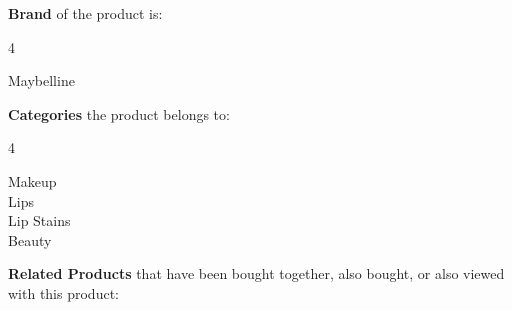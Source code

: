 \noindent \textbf{Brand} of the product is:

\begin{multicols}{4}
    \raggedright  %
	Maybelline
\end{multicols}


\noindent \textbf{Categories} the product belongs to:
\begin{multicols}{4}
	\raggedright Makeup\\ Lips\\ Lip Stains\\ Beauty
\end{multicols}


\noindent \textbf{Related Products} that have been bought together, also bought, or also viewed with this product:

